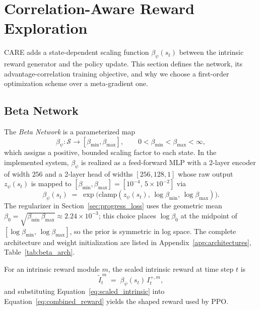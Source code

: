 \section{Correlation-Aware Reward Exploration}
\label{sec:care}

CARE adds a state-dependent scaling function $\beta_\psi(s_t)$ between the intrinsic reward generator and the policy update. This section defines the network, its advantage-correlation training objective, and why we choose a first-order optimization scheme over a meta-gradient one.

\subsection{Beta Network}
\label{sec:beta_network}

\begin{definition}
\label{def:beta_network}
The \emph{Beta Network} is a parameterized map
\begin{equation}
\beta_\psi : \mathcal{S} \to [\beta_\text{min}, \beta_\text{max}], \qquad 0 < \beta_\text{min} < \beta_\text{max} < \infty,
\label{eq:beta_network}
\end{equation}
which assigns a positive, bounded scaling factor to each state. In the implemented system, $\beta_\psi$ is realized as a feed-forward MLP with a 2-layer encoder of width $256$ and a 2-layer head of widths $[256, 128, 1]$ whose raw output $z_\psi(s_t)$ is mapped to $[\beta_\text{min}, \beta_\text{max}] = [10^{-4},\, 5\times 10^{-2}]$ via
\begin{equation*}
\beta_\psi(s_t) \;=\; \exp\bigl( \mathrm{clamp}(z_\psi(s_t),\, \log \beta_\text{min},\, \log \beta_\text{max}) \bigr).
\end{equation*}
The regularizer in Section~\ref{sec:progress_loss} uses the geometric mean $\beta_0 = \sqrt{\beta_\text{min}\,\beta_\text{max}} \approx 2.24 \times 10^{-3}$; this choice places $\log \beta_0$ at the midpoint of $[\log \beta_\text{min},\, \log \beta_\text{max}]$, so the prior is symmetric in log space. The complete architecture and weight initialization are listed in Appendix~\ref{app:architectures}, Table~\ref{tab:beta_arch}.
\end{definition}

For an intrinsic reward module $m$, the scaled intrinsic reward at time step $t$ is
\begin{equation}
\tilde I_t^{\,m} \;=\; \beta_\psi(s_t)\, I_t^{+,m},
\label{eq:scaled_intrinsic}
\end{equation}
and substituting Equation~\eqref{eq:scaled_intrinsic} into Equation~\eqref{eq:combined_reward} yields the shaped reward used by PPO.

